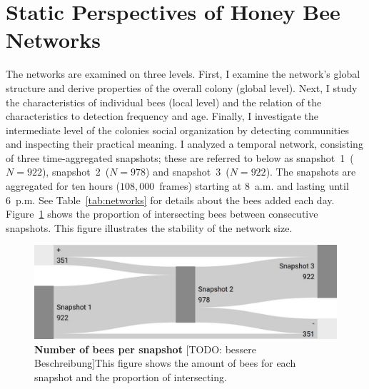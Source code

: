 \section{Static Perspectives of Honey Bee Networks}
The networks are examined on three levels.
First, I examine the network's global structure and derive properties of the overall colony (global level).
Next, I study the characteristics of individual bees (local level) and the relation of the characteristics to detection frequency and age.
Finally, I investigate the intermediate level of the colonies social organization by detecting communities and inspecting their practical meaning.
I analyzed a temporal network, consisting of three time-aggregated snapshots; these are referred to below as snapshot~1~($N = 922$), snapshot~2~($N = 978$) and snapshot~3~($N = 922$).
The snapshots are aggregated for ten hours ($108,000$~frames) starting at 8~a.m. and lasting until 6~p.m.
See Table~\ref{tab:networks} for details about the bees added each day. Figure~\ref{fig:network-matching} shows the proportion of intersecting bees between consecutive snapshots.
This figure illustrates the stability of the network size.




\begin{figure}[htb]
	\centering
	\includegraphics[width=1.0\textwidth]{Figures/network_matching}
	\caption[Number of bees per snapshot]{\textbf{Number of bees per snapshot} [TODO: bessere Beschreibung]This figure shows the amount of bees for each snapshot and the proportion of intersecting.}
	\label{fig:network-matching}
\end{figure}






